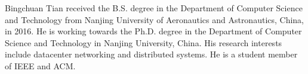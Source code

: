 \documentclass[10pt,journal,compsoc]{IEEEtran}
\begin{document}
\ifCLASSOPTIONcaptionsoff
  \newpage
\fi





\begin{IEEEbiography}{Bingchuan Tian} 
received the B.S. degree in the Department of Computer Science and Technology from Nanjing University of Aeronautics and Astronautics, China, in 2016. He is working towards the Ph.D. degree in the Department of Computer Science and Technology in Nanjing University, China. His research interests include datacenter networking and distributed systems. He is a student member of IEEE and ACM.
\end{IEEEbiography}
\end{document}
